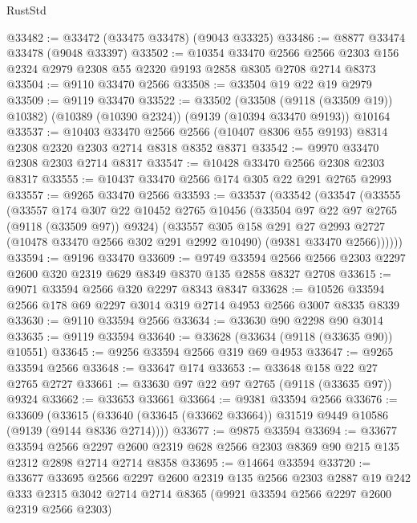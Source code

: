 \begin{lexlean}{RustStd}
\begin{coremodule}
@33482 := @33472 (@33475 @33478) (@9043 @33325)
@33486 := @8877 @33474 @33478 (@9048 @33397)
@33502 := @10354
    @33470
    @2566
    @2566
    @2303
    @156
    @2324
    @2979
    @2308
    @55
    @2320
    @9193
    @2858
    @8305
    @2708
    @2714
    @8373
@33504 := @9110 @33470 @2566
@33508 := @33504 @19 @22 @19 @2979
@33509 := @9119 @33470
@33522 := @33502
    (@33508 (@9118 (@33509 @19)) @10382)
    (@10389 (@10390 @2324))
    (@9139 (@10394 @33470 @9193))
    @10164
@33537 := @10403
    @33470
    @2566
    @2566
    (@10407 @8306 @55 @9193)
    @8314
    @2308
    @2320
    @2303
    @2714
    @8318
    @8352
    @8371
@33542 := @9970 @33470 @2308 @2303 @2714 @8317
@33547 := @10428 @33470 @2566 @2308 @2303 @8317
@33555 := @10437 @33470 @2566 @174 @305 @22 @291 @2765 @2993
@33557 := @9265 @33470 @2566
@33593 := @33537
    (@33542
      (@33547
        (@33555
          (@33557
            @174
            @307
            @22
            @10452
            @2765
            @10456
            (@33504 @97 @22 @97 @2765 (@9118 (@33509 @97)) @9324)
            (@33557
              @305
              @158
              @291
              @27
              @2993
              @2727
              (@10478 @33470 @2566 @302 @291 @2992 @10490)
              (@9381 @33470 @2566))))))
@33594 := @9196 @33470
@33609 := @9749
    @33594
    @2566
    @2566
    @2303
    @2297
    @2600
    @320
    @2319
    @629
    @8349
    @8370
    @135
    @2858
    @8327
    @2708
@33615 := @9071 @33594 @2566 @320 @2297 @8343 @8347
@33628 := @10526 @33594 @2566 @178 @69 @2297 @3014 @319 @2714 @4953 @2566 @3007 @8335 @8339
@33630 := @9110 @33594 @2566
@33634 := @33630 @90 @2298 @90 @3014
@33635 := @9119 @33594
@33640 := @33628 (@33634 (@9118 (@33635 @90)) @10551)
@33645 := @9256 @33594 @2566 @319 @69 @4953
@33647 := @9265 @33594 @2566
@33648 := @33647 @174
@33653 := @33648 @158 @22 @27 @2765 @2727
@33661 := @33630 @97 @22 @97 @2765 (@9118 (@33635 @97)) @9324
@33662 := @33653 @33661
@33664 := @9381 @33594 @2566
@33676 := @33609
    (@33615 (@33640 (@33645 (@33662 @33664)) @31519 @9449 @10586 (@9139 (@9144 @8336 @2714))))
@33677 := @9875 @33594
@33694 := @33677
    @33594
    @2566
    @2297
    @2600
    @2319
    @628
    @2566
    @2303
    @8369
    @90
    @215
    @135
    @2312
    @2898
    @2714
    @2714
    @8358
@33695 := @14664 @33594
@33720 := @33677
    @33695
    @2566
    @2297
    @2600
    @2319
    @135
    @2566
    @2303
    @2887
    @19
    @242
    @333
    @2315
    @3042
    @2714
    @2714
    @8365
    (@9921 @33594 @2566 @2297 @2600 @2319 @2566 @2303)

\end{coremodule}
\end{lexlean}
